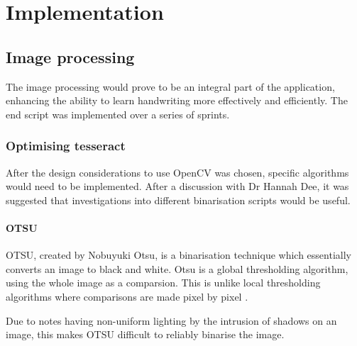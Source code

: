 \chapter{Implementation}




\section{Image processing}
The image processing would prove to be an integral part of the application, enhancing the ability to learn handwriting more effectively and efficiently. The end script was implemented over a series of sprints.
\subsection{Optimising tesseract}
After the design considerations to use OpenCV was chosen, specific algorithms would need to be implemented. After a discussion with Dr Hannah Dee, it was suggested that investigations into different binarisation scripts would be useful.

\subsubsection{OTSU}
OTSU, created by Nobuyuki Otsu, is a binarisation technique which essentially converts an image to black and white. Otsu is a global thresholding algorithm, using the whole image as a comparsion. This is unlike local thresholding algorithms where comparisons are made pixel by pixel \cite{citeulike:6044081}.

Due to notes having non-uniform lighting by the intrusion of shadows on an image, this makes OTSU difficult to reliably binarise the image.

